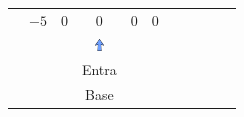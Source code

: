 \begin{frame}
{\begin{table}
\begin{tabular}{c c c c c c c c c c c}
				& \cellcolor{gray!50} $\scriptstyle -5$
				& \cellcolor{yellow!50} $\scriptstyle 0$
				& \cellcolor{yellow!50} $\scriptstyle 0$
				& \cellcolor{yellow!50} $\scriptstyle 0$
				& \cellcolor{yellow!50} $\scriptstyle 0$ 
				&
				&
				& \\
				\cline{1-8} 
				& 
				& 
				& \includegraphics[width=0.3cm,height=0.3cm]{setacima.jpg}
				& 
				& 
				& 
				&  
				&
				&
				& \\ 
				& 
				& 
				& \scriptsize \color{red} Entra 
				& 
				& 
				& 
				&  
				&
				&
				& \\
				& 
				& 
				& \scriptsize \color{red} Base 
				& 
				& 
				& 
				&  
				&
				&
				& \\


\end{tabular}
\end{table}}
\end{frame}

